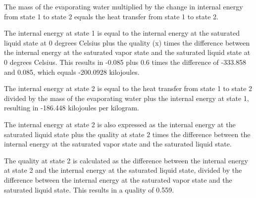 The mass of the evaporating water multiplied by the change in internal energy from state 1 to state 2 equals the heat transfer from state 1 to state 2.

The internal energy at state 1 is equal to the internal energy at the saturated liquid state at 0 degrees Celsius plus the quality (x) times the difference between the internal energy at the saturated vapor state and the saturated liquid state at 0 degrees Celsius. This results in -0.085 plus 0.6 times the difference of -333.858 and 0.085, which equals -200.0928 kilojoules.

The internal energy at state 2 is equal to the heat transfer from state 1 to state 2 divided by the mass of the evaporating water plus the internal energy at state 1, resulting in -186.448 kilojoules per kilogram.

The internal energy at state 2 is also expressed as the internal energy at the saturated liquid state plus the quality at state 2 times the difference between the internal energy at the saturated vapor state and the saturated liquid state.

The quality at state 2 is calculated as the difference between the internal energy at state 2 and the internal energy at the saturated liquid state, divided by the difference between the internal energy at the saturated vapor state and the saturated liquid state. This results in a quality of 0.559.